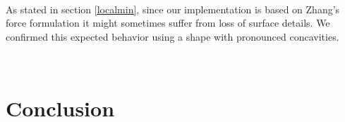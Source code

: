 \documentclass{article}
\begin{document}
\begin{figure}[H]
   ~
\end{figure}

As stated in section \ref{localmin}, since our implementation is based on
Zhang's force formulation it might sometimes suffer from loss of surface
details. We confirmed this expected behavior using a shape with pronounced
concavities.

\begin{figure}[H]
  \centering
  ~
\end{figure}


\section{Conclusion}



\end{document}

